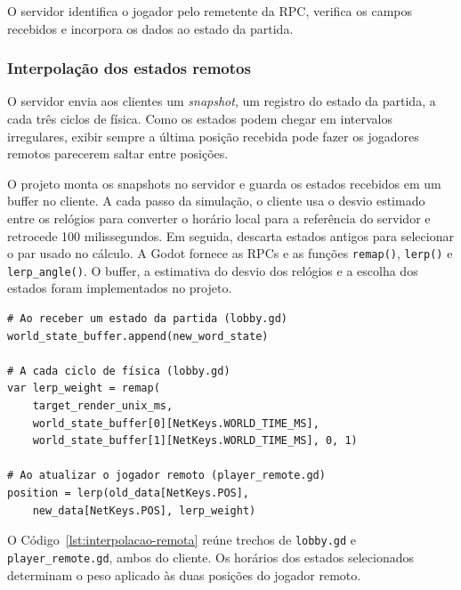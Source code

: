 O servidor identifica o jogador pelo remetente da RPC, verifica os campos recebidos e incorpora os dados ao estado da partida.

\subsubsection{Interpolação dos estados remotos}\label{sec:5.2.4.1}

O servidor envia aos clientes um \textit{snapshot}, um registro do estado da partida, a cada três ciclos de física. Como os estados podem chegar em intervalos irregulares, exibir sempre a última posição recebida pode fazer os jogadores remotos parecerem saltar entre posições. \cite{FIEDLER-INTERPOLACAO}

O projeto monta os snapshots no servidor e guarda os estados recebidos em um buffer no cliente. A cada passo da simulação, o cliente usa o desvio estimado entre os relógios para converter o horário local para a referência do servidor e retrocede 100 milissegundos. Em seguida, descarta estados antigos para selecionar o par usado no cálculo. A Godot fornece as RPCs e as funções \texttt{remap()}, \texttt{lerp()} e \texttt{lerp\_angle()}. O buffer, a estimativa do desvio dos relógios e a escolha dos estados foram implementados no projeto.

\par{}\noindent
\begin{minipage}{\linewidth}
\renewcommand{\lstlistingname}{Código}
\begin{lstlisting}[basicstyle=\small\ttfamily,breaklines=true,caption={Armazenamento e interpolação dos estados recebidos},label={lst:interpolacao-remota}]
# Ao receber um estado da partida (lobby.gd)
world_state_buffer.append(new_word_state)

# A cada ciclo de física (lobby.gd)
var lerp_weight = remap(
    target_render_unix_ms,
    world_state_buffer[0][NetKeys.WORLD_TIME_MS],
    world_state_buffer[1][NetKeys.WORLD_TIME_MS], 0, 1)

# Ao atualizar o jogador remoto (player_remote.gd)
position = lerp(old_data[NetKeys.POS],
    new_data[NetKeys.POS], lerp_weight)
\end{lstlisting}
\end{minipage}
\par{}

O Código~\ref{lst:interpolacao-remota} reúne trechos de \texttt{lobby.gd} e \texttt{player\_remote.gd}, ambos do cliente. Os horários dos estados selecionados determinam o peso aplicado às duas posições do jogador remoto.

